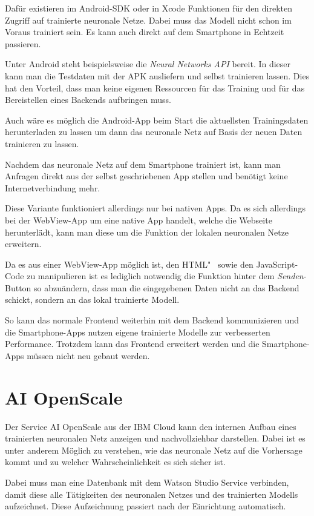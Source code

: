 Dafür existieren im Android-SDK oder in Xcode Funktionen für den direkten Zugriff auf trainierte neuronale Netze. Dabei
muss das Modell nicht schon im Voraus trainiert sein. Es kann auch direkt auf dem Smartphone in Echtzeit passieren.

Unter Android steht beispielsweise die \textit{Neural Networks API} bereit. In dieser kann man die Testdaten mit der APK
ausliefern und selbst trainieren lassen. Dies hat den Vorteil, dass man keine eigenen Ressourcen für das Training und
für das Bereistellen eines Backends aufbringen muss.

Auch wäre es möglich die Android-App beim Start die aktuellsten Trainingsdaten herunterladen zu lassen um dann das
neuronale Netz auf Basis der neuen Daten trainieren zu lassen.

Nachdem das neuronale Netz auf dem Smartphone trainiert ist, kann man Anfragen direkt aus der selbst geschriebenen App
stellen und benötigt keine Internetverbindung mehr.

Diese Variante funktioniert allerdings nur bei nativen Apps. Da es sich allerdings bei der WebView-App um eine native
App handelt, welche die Webseite herunterlädt, kann man diese um die Funktion der lokalen neuronalen Netze erweitern.

Da es aus einer WebView-App möglich ist, den HTML"~ sowie den JavaScript-Code zu manipulieren ist es lediglich notwendig
die Funktion hinter dem \textit{Senden}-Button so abzuändern, dass man die eingegebenen Daten nicht an das Backend
schickt, sondern an das lokal trainierte Modell.

So kann das normale Frontend weiterhin mit dem Backend kommunizieren und die Smartphone-Apps nutzen eigene trainierte
Modelle zur verbesserten Performance. Trotzdem kann das Frontend erweitert werden und die Smartphone-Apps müssen nicht
neu gebaut werden.

\section{AI OpenScale}
\label{ai_openscale}
Der Service AI OpenScale aus der IBM Cloud kann den internen Aufbau eines trainierten neuronalen Netz anzeigen und
nachvollziehbar darstellen. Dabei ist es unter anderem Möglich zu verstehen, wie das neuronale Netz auf die Vorhersage
kommt und zu welcher Wahrscheinlichkeit es sich sicher ist.

Dabei muss man eine Datenbank mit dem Watson Studio Service verbinden, damit diese alle Tätigkeiten des neuronalen
Netzes und des trainierten Modells aufzeichnet. Diese Aufzeichnung passiert nach der Einrichtung automatisch.

